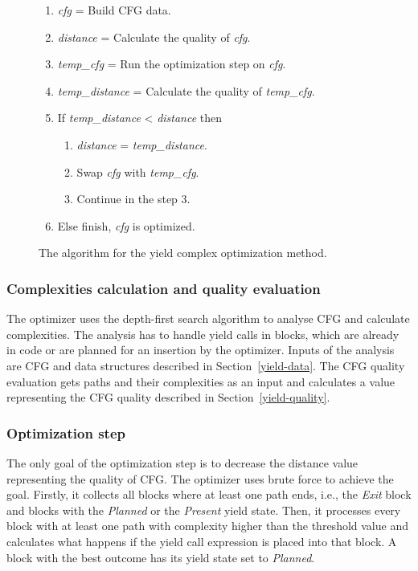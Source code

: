 \begin{figure}[h!]
\caption{The algorithm for the yield complex optimization method.}
\label{yield-algorithm}
\begin{enumerate}
\item{\emph{cfg} = Build CFG data.}
\item{\emph{distance} = Calculate the quality of \emph{cfg}.}
\item{\emph{temp\_cfg} = Run the optimization step on \emph{cfg}.}
\item{\emph{temp\_distance} = Calculate the quality of \emph{temp\_cfg}.}
\item{If \emph{temp\_distance} < \emph{distance} then}
	\begin{enumerate}[label=5.\arabic*.]
	\item{\emph{distance} = \emph{temp\_distance}.}
	\item{Swap \emph{cfg} with \emph{temp\_cfg}.}
	\item{Continue in the step 3.}
	\end{enumerate}
\item{Else finish, \emph{cfg} is optimized.}
\end{enumerate}
\end{figure}

\pagebreak[4]

\subsubsection{Complexities calculation and quality evaluation}
The optimizer uses the depth-first search algorithm to analyse CFG and calculate complexities. The analysis has to handle yield calls in blocks, which are already in code or are planned for an insertion by the optimizer. Inputs of the analysis are CFG and data structures described in Section~\ref{yield-data}. The CFG quality evaluation gets paths and their complexities as an input and calculates a value representing the CFG quality described in Section~\ref{yield-quality}.

\subsubsection{Optimization step}
The only goal of the optimization step is to decrease the distance value representing the quality of CFG. The optimizer uses brute force to achieve the goal. Firstly, it collects all blocks where at least one path ends, i.e., the \textit{Exit} block and blocks with the \emph{Planned} or the \emph{Present} yield state. Then, it processes every block with at least one path with complexity higher than the threshold value and calculates what happens if the yield call expression is placed into that block. A block with the best outcome has its yield state set to \emph{Planned}.

